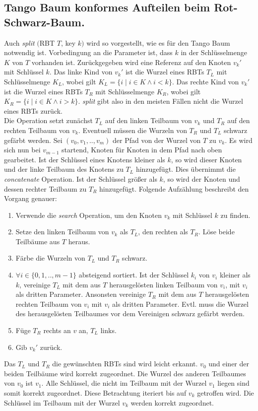 \documentclass[a4paper,12pt]{article}
\begin{document}
\subsection{Tango Baum konformes Aufteilen beim Rot-Schwarz-Baum.}
Auch \textit{split} $($RBT $T$, key $k)$ wird so vorgestellt, wie es für den Tango Baum notwendig ist. Vorbedingung an die Parameter ist, dass $k$ in der Schlüsselmenge $K$ von $T$ vorhanden ist. Zurückgegeben wird eine Referenz auf den Knoten ${v_k}'$ mit Schlüssel $k$. Das linke Kind von ${v_k}'$ ist die Wurzel eines RBTs $T_L$ mit Schlüsselmenge $K_L$, wobei gilt ${K_L=\{i \mid  i\in K \land i <k\}}$. Das rechte Kind von ${v_k}'$ ist die Wurzel eines RBTs $T_R$ mit Schlüsselmenge $K_R$, wobei gilt ${K_R = \{i \mid i\in K \land i > k\}}$. \textit{split} gibt also in den meisten Fällen nicht die Wurzel eines RBTs zurück.\\ Die Operation setzt zunächst $T_L$ auf den linken Teilbaum von $v_k$ und $T_R$ auf den rechten Teilbaum von $v_k$. Eventuell müssen die Wurzeln von $T_R$ und $T_L$ schwarz gefärbt werden. Sei $(v_0,v_1,..,v_m)$  der Pfad von der Wurzel von $T$ zu $v_k$. Es wird sich nun bei $v_{m-1}$ startend, Knoten für Knoten in dem Pfad nach oben gearbeitet. Ist der Schlüssel eines Knotens kleiner als $k$, so wird dieser Knoten und der linke Teilbaum des Knotens zu $T_L$ hinzugefügt. Dies übernimmt die \textit{concatenate} Operation. Ist der Schlüssel größer als $k$, so wird der Knoten und dessen rechter Teilbaum  zu $T_R$ hinzugefügt. Folgende Aufzählung beschreibt den Vorgang genauer:

\begin{enumerate}
	\item Verwende die \textit{search} Operation, um den Knoten $v_k$ mit Schlüssel $k$ zu finden.
	\item Setze den linken Teilbaum von $v_k$ als $T_L$, den rechten als $T_R$. Löse beide Teilbäume aus $T$ heraus.
	\item Färbe die Wurzeln von $T_L$ und $T_R$ schwarz.
	\item $\forall i \in \{0,1,..,m-1\}$ absteigend sortiert. Ist der Schlüssel $k_i$ von $v_i$ kleiner als $k$, vereinige $T_L$ mit dem aus $T$ herausgelösten linken Teilbaum von $v_i$, mit  $v_i$ als dritten Parameter. Ansonsten vereinige $T_R$ mit dem aus $T$ herausgelösten rechten Teilbaum von $v_i$ mit  $v_i$ als dritten Parameter. Evtl. muss die Wurzel des herausgelösten Teilbaumes vor dem Vereinigen schwarz gefärbt werden. 
	\item Füge $T_R$ rechts an $v$ an, $T_L$ links.
	\item Gib ${v_k}'$ zurück.
\end{enumerate}   
Das $T_L$ und $T_R$ die gewünschten RBTs sind wird leicht erkannt. $v_0$ und einer der beiden Teilbäume wird korrekt zugeordnet. Die Wurzel des anderen Teilbaumes von $v_0$ ist $v_{1}$. Alle Schlüssel, die nicht im Teilbaum mit der Wurzel $v_{1}$ liegen sind somit korrekt zugeordnet. Diese Betrachtung iteriert bis auf $v_k$ getroffen wird. Die Schlüssel im Teilbaum mit der Wurzel $v_k$ werden korrekt zugeordnet. 
\end{document}

